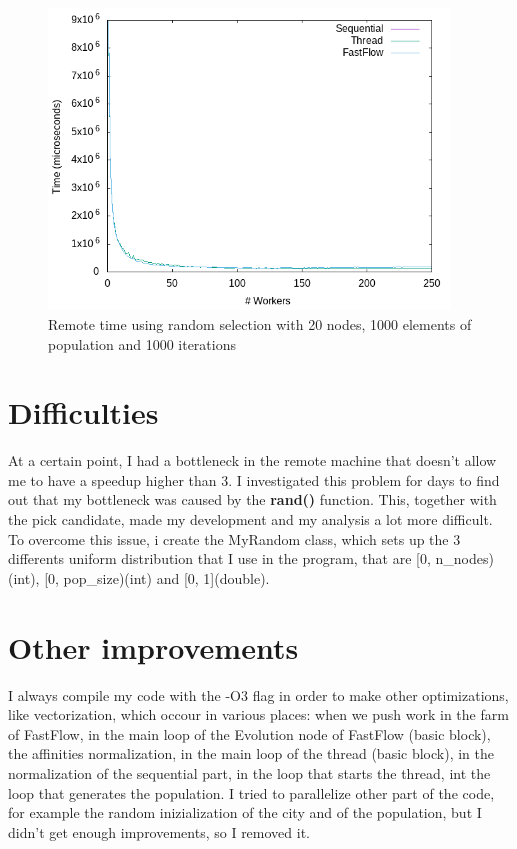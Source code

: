 \documentclass{article}
\begin{document}
    \begin{figure}
        \includegraphics[width=\linewidth,height=8cm]{img/remote_t_rand.png}
        \caption{Remote time using random selection with 20 nodes, 1000 elements of population and 1000 iterations}
        \label{fig:local_time}
    \end{figure}

    \section{Difficulties}
	At a certain point, I had a bottleneck in the remote machine that doesn't allow me to have a speedup higher than 3. I investigated this problem for days to find out that my bottleneck was caused by the \textbf{rand()} function. This, together with the pick candidate, made my development and my analysis a lot more difficult. To overcome this issue, i create the MyRandom class, which sets up the 3 differents uniform distribution that I use in the program, that are [0, n\_nodes)(int), [0, pop\_size)(int) and [0, 1](double).

    \section{Other improvements}
	I always compile my code with the -O3 flag in order to make other optimizations, like vectorization, which occour in various places: when we push work in the farm of FastFlow, in the main loop of the Evolution node of FastFlow (basic block), the affinities normalization, in the main loop of the thread (basic block), in the normalization of the sequential part, in the loop that starts the thread, int the loop that generates the population. I tried to parallelize other part of the code, for example the random inizialization of the city and of the population, but I didn't get enough improvements, so I removed it.
\end{document}
